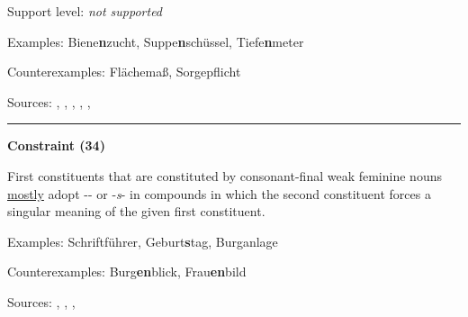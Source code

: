 \noindent
Support level: \textit{not supported}

\vspace{0.3em}

\noindent
Examples: Biene\textbf{n}zucht, Suppe\textbf{n}schüssel, Tiefe\textbf{n}meter

\noindent
Counterexamples: Fläche{\zeroLinker}maß, Sorge{\zeroLinker}pflicht

\vspace{0.3em}

\noindent
Sources: \citet[229]{eisenberg_2013}, \citet[573]{fuhrhop_kuerschner_2015}, \citet[3]{krott_etal_2007}, \citet[151, 157]{libben_etal_2009}, \citet[83, 92]{ortner_mueller-bollhagen_1991}, \citet[9]{schaefer_pankratz_2018}


\hrule




\newpage

\vspace{0.4em}

\begin{center}
\textbf{Constraint (34)}
\end{center}

\noindent
First constituents that are constituted by consonant-final weak feminine nouns \underline{mostly} adopt \mbox{-{\zeroLinker}-} or -\textit{s}- in compounds in which the second constituent forces a singular meaning of the given first constituent.
\vspace{0.35em}


\vspace{0.3em}

\noindent
Examples: Schrift{\zeroLinker}führer, Geburt\textbf{s}tag, Burg{\zeroLinker}anlage

\noindent
Counterexamples: Burg\textbf{en}blick, Frau\textbf{en}bild

\vspace{0.3em}

\noindent
Sources: \citet[229]{eisenberg_2013}, \citet[3]{krott_etal_2007}, \citet[80]{nuebling_szczepaniak_2013}, \citet[94, 110]{ortner_mueller-bollhagen_1991}


